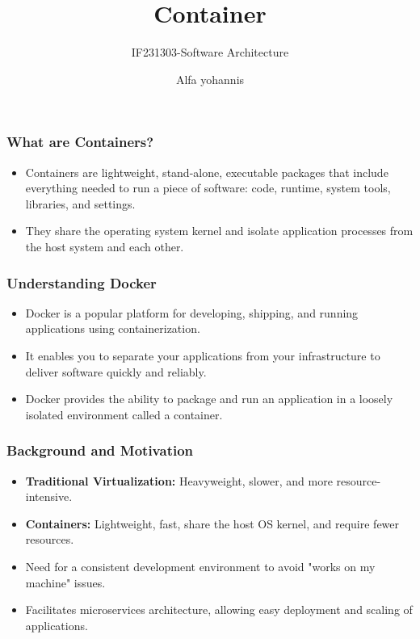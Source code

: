 \documentclass[aspectratio=169, table]{beamer}
\title{\Huge{Container} \vspace{20pt}}
\subtitle{IF231303-Software Architecture}
\author{Alfa yohannis}
\begin{document}
    \begin{frame}[plain]
        \maketitle
    \end{frame}

    \begin{frame}
        \frametitle{What are Containers?}
        \begin{itemize}
            \item Containers are lightweight, stand-alone, executable packages that include everything needed to run a piece of software: code, runtime, system tools, libraries, and settings.
            \item They share the operating system kernel and isolate application processes from the host system and each other.
        \end{itemize}
    \end{frame}

    \begin{frame}
        \frametitle{Understanding Docker}
        \begin{itemize}
            \item Docker is a popular platform for developing, shipping, and running applications using containerization.
            \item It enables you to separate your applications from your infrastructure to deliver software quickly and reliably.
            \item Docker provides the ability to package and run an application in a loosely isolated environment called a container.
        \end{itemize}
    \end{frame}


    \begin{frame}
        \frametitle{Background and Motivation}
        \begin{itemize}
            \item \textbf{Traditional Virtualization:} Heavyweight, slower, and more resource-intensive.
            \item \textbf{Containers:} Lightweight, fast, share the host OS kernel, and require fewer resources.
            \item Need for a consistent development environment to avoid "works on my machine" issues.
            \item Facilitates microservices architecture, allowing easy deployment and scaling of applications.
        \end{itemize}
    \end{frame}
\end{document}
